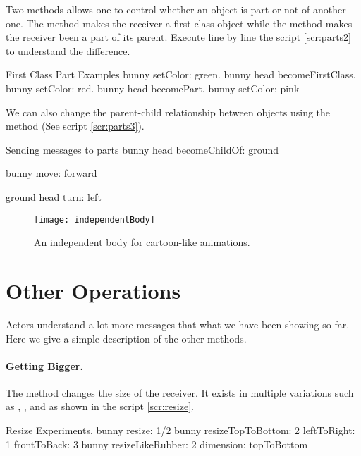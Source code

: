 Two methods allows one to control whether an object is part or not of another one. 
The method  makes the receiver a first class object while the method 
 makes the receiver been a part of its parent. Execute line by line the  script \ref{scr:parts2} to understand the difference. 

\begin{scriptwithtitle}{First Class Part Examples}\label{scr:parts2}
bunny setColor: green.
bunny head  becomeFirstClass.
bunny setColor: red.
bunny head  becomePart.
bunny setColor: pink
\end{scriptwithtitle}

We can also change the parent-child relationship between objects using the method 
(See script \ref{scr:parts3}). 

\begin{scriptwithtitle}{Sending messages to parts}\label{scr:parts3}
bunny head becomeChildOf: ground

bunny move: forward

ground head turn: left
\end{scriptwithtitle}

\begin{figure}
\begin{center}\texttt{[image: independentBody]}\end{center}
\caption{An independent body for cartoon-like animations. \label{fig:independentBody}}
\end{figure}



\section{Other Operations}
Actors understand a lot more messages that what we have been showing so far. Here we give a 
simple description of the other methods. 

\paragraph{Getting Bigger.} The method  changes the size of the receiver. It exists in multiple variations such as , , and  as shown in the script \ref{scr:resize}.

\begin{scriptwithtitle}{Resize Experiments.}\label{scr:resize}
bunny resize: 1/2
bunny resizeTopToBottom: 2 leftToRight: 1 frontToBack: 3
bunny resizeLikeRubber: 2 dimension: topToBottom
\end{scriptwithtitle}

